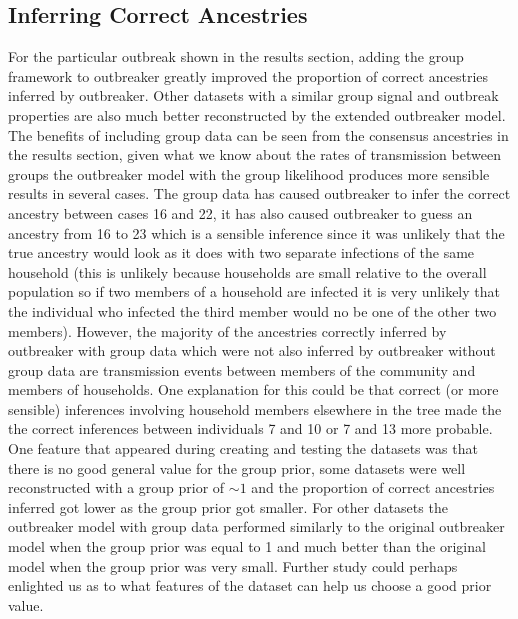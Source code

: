 \documentclass[11pt,a4paper]{report}
\begin{document}
\subsection{Inferring Correct Ancestries}
For the particular outbreak shown in the results section, adding the group framework to outbreaker greatly improved the proportion of correct ancestries inferred by outbreaker. Other datasets with a similar group signal and outbreak properties are also much better reconstructed by the extended outbreaker model. The benefits of including group data can be seen from the consensus ancestries in the results section, given what we know about the rates of transmission between groups the outbreaker model with the group likelihood produces more sensible results in several cases. The group data has caused outbreaker to infer the correct ancestry between cases 16 and 22, it has also caused outbreaker to guess an ancestry from 16 to 23 which is a sensible inference since it was unlikely that the true ancestry would look as it does with two separate infections of the same household (this is unlikely because households are small relative to the overall population so if two members of a household are infected it is very unlikely that the individual who infected the third member would no be one of the other two members). However, the majority of the ancestries correctly inferred by outbreaker with group data which were not also inferred by outbreaker without group data are transmission events between members of the community and members of households. One explanation for this could be that correct (or more sensible) inferences involving household members elsewhere in the tree made the the correct inferences between individuals 7 and 10 or 7 and 13 more probable. One feature that appeared during creating and testing the datasets was that there is no good general value for the group prior, some datasets were well reconstructed with a group prior of $\sim 1$ and the proportion of correct ancestries inferred got lower as the group prior got smaller. For other datasets the outbreaker model with group data performed similarly to the original outbreaker model when the group prior was equal to 1 and much better than the original model when the group prior was very small. Further study could perhaps enlighted us as to what features of the dataset can help us choose a good prior value.  
\end{document}

